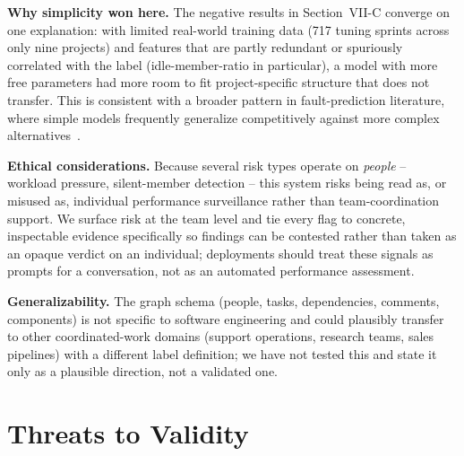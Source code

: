 \documentclass[conference]{IEEEtran}
\begin{document}
\textbf{Why simplicity won here.} The negative results in Section~VII-C converge on
one explanation: with limited real-world training data (717 tuning sprints across
only nine projects) and features that are partly redundant or spuriously correlated
with the label (idle-member-ratio in particular), a model with more free parameters
had more room to fit project-specific structure that does not transfer. This is
consistent with a broader pattern in fault-prediction literature, where simple
models frequently generalize competitively against more complex
alternatives~\cite{fault-prediction-review}.

\textbf{Ethical considerations.} Because several risk types operate on
\emph{people} -- workload pressure, silent-member detection -- this system risks
being read as, or misused as, individual performance surveillance rather than
team-coordination support. We surface risk at the team level and tie every flag to
concrete, inspectable evidence specifically so findings can be contested rather than
taken as an opaque verdict on an individual; deployments should treat these signals
as prompts for a conversation, not as an automated performance assessment.

\textbf{Generalizability.} The graph schema (people, tasks, dependencies, comments,
components) is not specific to software engineering and could plausibly transfer to
other coordinated-work domains (support operations, research teams, sales
pipelines) with a different label definition; we have not tested this and state it
only as a plausible direction, not a validated one.

\section{Threats to Validity}
\end{document}
